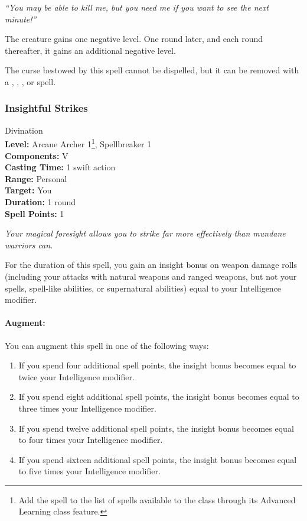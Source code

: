 \emph{``You may be able to kill me, but you need me if you want to see the next minute!''}

The creature gains one negative level. One round later, and each round thereafter, it gains an additional negative level.

The curse bestowed by this spell cannot be dispelled, but it can be removed with a , , , or  spell.

\subsubsection{Insightful Strikes}
\label{Spell:InsightfulStrikes}
Divination
\\ \textbf{Level:} Arcane Archer 1\footnote{Add the spell to the list of spells available to the class through its Advanced Learning class feature.}, Spellbreaker 1
\\ \textbf{Components:} V
\\ \textbf{Casting Time:} 1 swift action
\\ \textbf{Range:} Personal
\\ \textbf{Target:} You
\\ \textbf{Duration:} 1 round
\\ \textbf{Spell Points:} 1

\emph{Your magical foresight allows you to strike far more effectively than mundane warriors can.}

For the duration of this spell, you gain an insight bonus on weapon damage rolls (including your attacks with natural weapons and ranged weapons, but not your spells, spell-like abilities, or supernatural abilities) equal to your Intelligence modifier.

\paragraph{Augment:} You can augment this spell in one of the following ways:
\begin{enumerate}
 \item If you spend four additional spell points, the insight bonus becomes equal to twice your Intelligence modifier.
 \item If you spend eight additional spell points, the insight bonus becomes equal to three times your Intelligence modifier.
 \item If you spend twelve additional spell points, the insight bonus becomes equal to four times your Intelligence modifier.
 \item If you spend sixteen additional spell points, the insight bonus becomes equal to five times your Intelligence modifier.
\end{enumerate}

